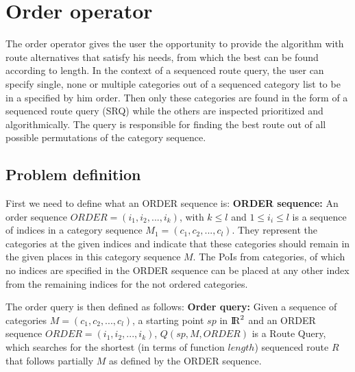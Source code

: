 

\section{Order operator}
The order operator gives the user the opportunity to provide the algorithm with route alternatives that satisfy his needs, from which the best can be found according to length.  In the context of a sequenced route query, the user can specify single, none or multiple categories out of a sequenced category list to be in a specified by him order. Then only these categories are found in the form of a sequenced route query (SRQ) while the others are inspected prioritized and algorithmically. The query is responsible for finding the best route out of all possible permutations of the category sequence.

\subsection{Problem definition} 
\label{sec:problemOrder}
First we need to define what an ORDER sequence is:\newline
\textbf{ORDER sequence:} An order sequence $ORDER = (i_1, i_2, ..., i_k)$, with $k \leq l$ and $1 \leq i_i \leq l$ is a sequence of indices in a category sequence $M_1 = (c_1, c_2, ..., c_l)$. They represent the categories at the given indices and indicate that these categories should remain in the given places in this category sequence $M$. The PoIs from categories, of which no indices are specified in the ORDER sequence can be placed at any other index from the remaining indices for the not ordered categories. \newline

The order query is then defined as follows: \newline
\textbf{Order query:} Given a sequence of categories $M = (c_1, c_2, ..., c_l)$, a starting point $sp$ in ${\rm I\!R}^2$ and an ORDER sequence $ORDER = (i_1, i_2, ..., i_k)$, $Q(sp, M, ORDER)$ is a Route Query, which searches for the shortest (in terms of function $length$) sequenced route $R$ that follows partially $M$ as defined by the ORDER sequence.


